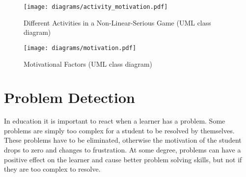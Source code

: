\begin{figure}
    \centering
    \texttt{[image: diagrams/activity\_motivation.pdf]}
    \caption[Different Activities in a Non-Linear-Serious Game (UML class diagram)]
    {Different Activities in a Non-Linear-Serious Game (UML class diagram)}
    \label{activity_motivation}
\end{figure}

\begin{figure}
    \centering
    \texttt{[image: diagrams/motivation.pdf]}
    \caption[Motivational Factors (UML class diagram)]
    {Motivational Factors (UML class diagram)}
    \label{motivation}
\end{figure}




\section{Problem Detection}
\label{Problem Detection}
In education it is important to react when a learner has a problem. Some
problems are simply too complex for a student to be resolved by themselves. These
problems have to be eliminated, otherwise the motivation of the student drops to
zero and changes to frustration. At some degree, problems can have a positive
effect on the learner and cause better problem solving skills, but not if they
are too complex to resolve.

